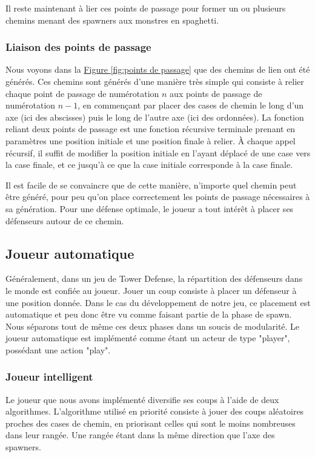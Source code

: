 \documentclass{article}
\begin{document}
Il reste maintenant à lier ces points de passage pour former un ou plusieurs chemins menant des spawners aux monstres en spaghetti.

\subsubsection{Liaison des points de passage}

Nous voyons dans la \hyperref[fig:points de passage]{Figure \ref{fig:points de passage}} que des chemins de lien ont été générés. Ces chemins sont générés d'une manière très simple qui consiste à relier chaque point de passage de numérotation $n$ aux points de passage de numérotation $n - 1$, en commençant par placer des cases de chemin le long d'un axe (ici des abscisses) puis le long de l'autre axe (ici des ordonnées). La fonction reliant deux points de passage est une fonction récursive terminale prenant en paramètres une position initiale et une position finale à relier. À chaque appel récursif, il suffit de modifier la position initiale en l'ayant déplacé de une case vers la case finale, et ce jusqu'à ce que la case initiale corresponde à la case finale.

Il est facile de se convaincre que de cette manière, n'importe quel chemin peut être généré, pour peu qu'on place correctement les points de passage nécessaires à sa génération.
Pour une défense optimale, le joueur a tout intérêt à placer ses défenseurs autour de ce chemin.

\subsection{Joueur automatique}

Généralement, dans un jeu de Tower Defense, la répartition des défenseurs dans le monde est confiée au joueur. Jouer un coup consiste à placer un défenseur à une position donnée. Dans le cas du développement de notre jeu, ce placement est automatique et peu donc être vu comme faisant partie de la phase de spawn. Nous séparons tout de même ces deux phases dans un soucis de modularité.
Le joueur automatique est implémenté comme étant un acteur de type "player", possédant une action "play".

\subsubsection{Joueur intelligent}

Le joueur que nous avons implémenté diversifie ses coups à l'aide de deux algorithmes.
L'algorithme utilisé en priorité consiste à jouer des coups aléatoires proches des cases de chemin, en priorisant celles qui sont le moins nombreuses dans leur rangée. Une rangée étant dans la même direction que l'axe des spawners.
\end{document}
